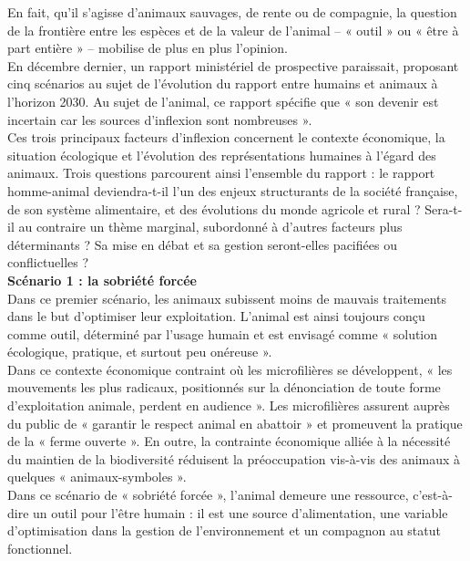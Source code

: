 \documentclass[10pt]{article}
\begin{document}
En fait, qu’il s’agisse d’animaux sauvages, de rente ou de compagnie, la question de la frontière entre les espèces et de la valeur de l’animal – « outil » ou « être à part entière » – mobilise de plus en plus l’opinion.\\

En décembre dernier, un rapport ministériel de prospective paraissait, proposant cinq scénarios au sujet de l’évolution du rapport entre humains et animaux à l’horizon 2030. Au sujet de l’animal, ce rapport spécifie que « son devenir est incertain car les sources d’inflexion sont nombreuses ».\\

Ces trois principaux facteurs d’inflexion concernent le contexte économique, la situation écologique et l'évolution des représentations humaines à l’égard des animaux. 
Trois questions parcourent ainsi l’ensemble du rapport : le rapport homme-animal deviendra-t-il l’un des enjeux structurants de la société française, de son système alimentaire, et des évolutions du monde agricole et rural ? Sera-t-il au contraire un thème marginal, subordonné à d'autres facteurs plus déterminants ? Sa mise en débat et sa gestion seront-elles pacifiées ou conflictuelles ?\\

\textbf{Scénario 1 : la sobriété forcée}\\

Dans ce premier scénario, les animaux subissent moins de mauvais traitements dans le but d’optimiser leur exploitation. L’animal est ainsi toujours conçu comme outil, déterminé par l’usage humain et est envisagé comme « solution écologique, pratique, et surtout peu onéreuse ».\\

Dans ce contexte économique contraint où les microfilières se développent, « les mouvements les plus radicaux, positionnés sur la dénonciation de toute forme d’exploitation animale, perdent en audience ». Les microfilières assurent auprès du public de « garantir le respect animal en abattoir » et promeuvent la pratique de la « ferme ouverte ». En outre, la contrainte économique alliée à la nécessité du maintien de la biodiversité réduisent la préoccupation vis-à-vis des animaux à quelques « animaux-symboles ».\\

Dans ce scénario de « sobriété forcée », l’animal demeure une ressource, c’est-à-dire un outil pour l’être humain : il est une source d’alimentation, une variable d’optimisation dans la gestion de l’environnement et un compagnon au statut fonctionnel.\\
\end{document}
